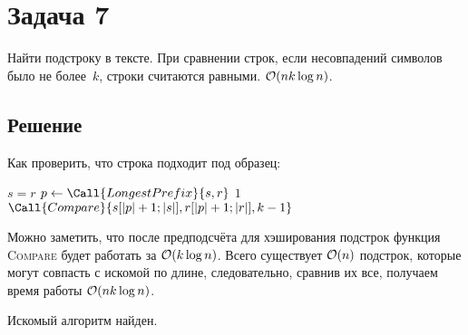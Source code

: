 \section{Задача 7}
Найти подстроку в тексте. При сравнении строк, если несовпадений символов было не более~$k$, строки считаются равными. $\mathcal{O}(nk \log n)$.

\subsection{Решение}
Как проверить, что строка подходит под образец:
\begin{algorithmic}
            \State \Return $s = r$
        \Else
            \State $p \gets \Call{LongestPrefix}{s, r}$
                \State \Return $1$
            \Else
                \State \Return $\Call{Compare}{s[|p| + 1; |s|], r[|p| + 1; |r|], k - 1}$
            \EndIf
        \EndIf
    \EndFunction
\end{algorithmic}

Можно заметить, что после предподсчёта для хэширования подстрок
функция \textsc{Compare} будет работать за $\mathcal{O}(k \log n)$.
Всего существует $\mathcal{O}(n)$ подстрок, которые могут совпасть с искомой по длине,
следовательно, сравнив их все, получаем время работы $\mathcal{O}(nk \log n)$.

Искомый алгоритм найден.
